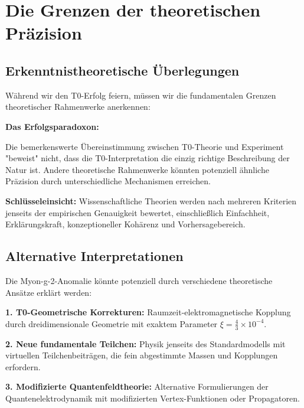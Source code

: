 \documentclass[12pt,a4paper]{report}
\begin{document}
	\section{Die Grenzen der theoretischen Präzision}
	\label{sec:limits_precision}
	
	\subsection{Erkenntnistheoretische Überlegungen}
	\label{subsec:epistemological_considerations}
	
	Während wir den T0-Erfolg feiern, müssen wir die fundamentalen Grenzen theoretischer Rahmenwerke anerkennen:
	
	\begin{tcolorbox}[colback=yellow!5!white,colframe=orange!75!black,title=Theoretische Demut]
		\textbf{Das Erfolgsparadoxon:}
		
		Die bemerkenswerte Übereinstimmung zwischen T0-Theorie und Experiment "beweist" nicht, dass die T0-Interpretation die einzig richtige Beschreibung der Natur ist. Andere theoretische Rahmenwerke könnten potenziell ähnliche Präzision durch unterschiedliche Mechanismen erreichen.
		
		\textbf{Schlüsseleinsicht:} Wissenschaftliche Theorien werden nach mehreren Kriterien jenseits der empirischen Genauigkeit bewertet, einschließlich Einfachheit, Erklärungskraft, konzeptioneller Kohärenz und Vorhersagebereich.
	\end{tcolorbox}
	
	\subsection{Alternative Interpretationen}
	\label{subsec:alternative_interpretations}
	
	Die Myon-g-2-Anomalie könnte potenziell durch verschiedene theoretische Ansätze erklärt werden:
	
	\textbf{1. T0-Geometrische Korrekturen:}
	Raumzeit-elektromagnetische Kopplung durch dreidimensionale Geometrie mit exaktem Parameter $\xi = \frac{4}{3} \times 10^{-4}$.
	
	\textbf{2. Neue fundamentale Teilchen:}
	Physik jenseits des Standardmodells mit virtuellen Teilchenbeiträgen, die fein abgestimmte Massen und Kopplungen erfordern.
	
	\textbf{3. Modifizierte Quantenfeldtheorie:}
	Alternative Formulierungen der Quantenelektrodynamik mit modifizierten Vertex-Funktionen oder Propagatoren.
	
\end{document}

